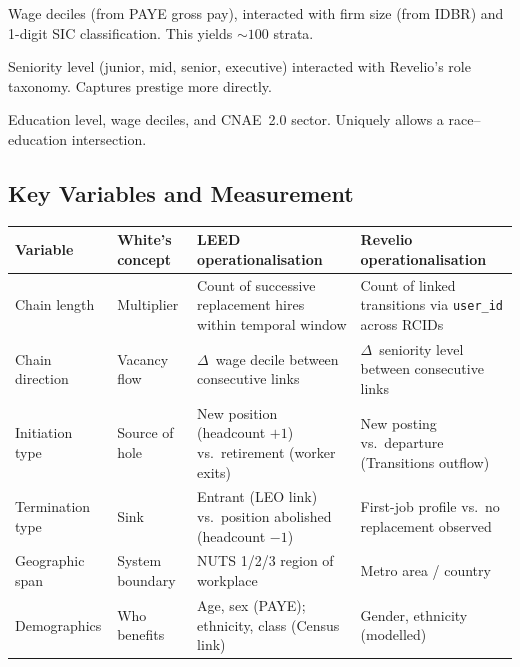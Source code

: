 \documentclass[a4paper]{tufte-handout}
\begin{document}
\begin{description}[style=nextline, font=\normalfont\itshape]
  \item[LEED strata]
    Wage deciles (from PAYE gross pay), interacted with firm size (from IDBR) and 1-digit SIC classification. This yields ${\sim}100$ strata.
  \item[Revelio strata]
    Seniority level (junior, mid, senior, executive) interacted with Revelio's role taxonomy. Captures prestige more directly.
  \item[RAIS strata]
    Education level, wage deciles, and CNAE~2.0 sector. Uniquely allows a race--education intersection.
\end{description}


\subsection{Key Variables and Measurement}

\begin{fullwidth}
\smallskip
\small
\begin{tabularx}{\linewidth}{@{}l l X X@{}}
  \toprule
  \textbf{Variable} & \textbf{White's concept} & \textbf{LEED operationalisation} & \textbf{Revelio operationalisation} \\
  \midrule
  Chain length     & Multiplier       & Count of successive replacement hires within temporal window & Count of linked transitions via \texttt{user\_id} across RCIDs \\[3pt]
  Chain direction  & Vacancy flow     & $\Delta$~wage decile between consecutive links & $\Delta$~seniority level between consecutive links \\[3pt]
  Initiation type  & Source of hole   & New position (headcount $+1$) vs.\ retirement (worker exits) & New posting vs.\ departure (Transitions outflow) \\[3pt]
  Termination type & Sink             & Entrant (LEO link) vs.\ position abolished (headcount $-1$) & First-job profile vs.\ no replacement observed \\[3pt]
  Geographic span  & System boundary  & NUTS 1/2/3 region of workplace & Metro area / country \\[3pt]
  Demographics     & Who benefits     & Age, sex (PAYE); ethnicity, class (Census link) & Gender, ethnicity (modelled) \\
  \bottomrule
\end{tabularx}
\smallskip
\end{fullwidth}
\end{document}
